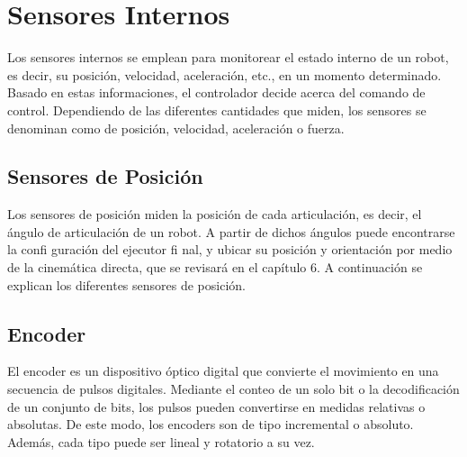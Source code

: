\section{\textbf{Sensores Internos}}
Los sensores internos se emplean para monitorear el estado interno de un robot, es decir, su posición, velocidad, aceleración, etc., en un momento determinado. Basado en estas informaciones, el controlador decide acerca del comando de control. Dependiendo de las diferentes cantidades que miden, los sensores se denominan como de posición, velocidad, aceleración o fuerza.

\subsection{\textbf{Sensores de Posición}}
Los sensores de posición miden la posición de cada articulación, es decir, el ángulo de articulación de un robot. A partir de dichos ángulos puede encontrarse la confi guración del ejecutor fi nal, y ubicar su posición y orientación por medio de la cinemática directa, que se revisará en el capítulo 6. A continuación se explican los diferentes sensores de posición.

\subsection*{\quad\textbf{Encoder}}
El encoder es un dispositivo óptico digital que convierte el movimiento en una secuencia de pulsos digitales. Mediante el conteo de un solo bit o la decodificación de un conjunto de bits, los pulsos pueden convertirse en medidas relativas o absolutas. De este modo, los encoders son de tipo incremental o absoluto. Además, cada tipo puede ser lineal y rotatorio a su vez.

